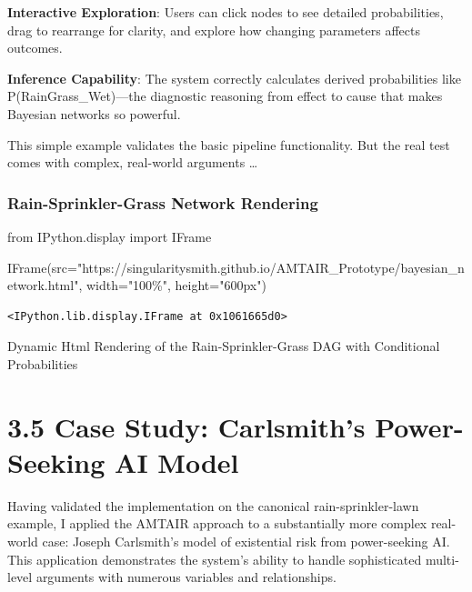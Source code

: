 \documentclass[
  11pt,
  letterpaper,
  openany]{book}
\newenvironment{Shaded}{\begin{snugshade}}{\end{snugshade}}
\newcommand{\ImportTok}[1]{\textcolor[rgb]{0.00,0.46,0.62}{#1}}
\newcommand{\NormalTok}[1]{\textcolor[rgb]{0.00,0.23,0.31}{#1}}
\newcommand{\OperatorTok}[1]{\textcolor[rgb]{0.37,0.37,0.37}{#1}}
\newcommand{\StringTok}[1]{\textcolor[rgb]{0.13,0.47,0.30}{#1}}
\begin{document}
\begin{landscape}
\textbf{Interactive Exploration}: Users can click nodes to see detailed
probabilities, drag to rearrange for clarity, and explore how changing
parameters affects outcomes.

\textbf{Inference Capability}: The system correctly calculates derived
probabilities like P(Rain\textbar Grass\_Wet)---the diagnostic reasoning
from effect to cause that makes Bayesian networks so powerful.

This simple example validates the basic pipeline functionality. But the
real test comes with complex, real-world arguments \ldots{}

\subsubsection{Rain-Sprinkler-Grass Network
Rendering}\label{rain-sprinkler-grass-network-rendering-1}

\begin{Shaded}
\begin{Highlighting}[]
\ImportTok{from}\NormalTok{ IPython.display }\ImportTok{import}\NormalTok{ IFrame}

\NormalTok{IFrame(src}\OperatorTok{=}\StringTok{"https://singularitysmith.github.io/AMTAIR\_Prototype/bayesian\_network.html"}\NormalTok{, width}\OperatorTok{=}\StringTok{"100\%"}\NormalTok{, height}\OperatorTok{=}\StringTok{"600px"}\NormalTok{)}
\end{Highlighting}
\end{Shaded}

\label{rain_sprinkler_grass_example_network_rendering2}
\begin{verbatim}
<IPython.lib.display.IFrame at 0x1061665d0>
\end{verbatim}

Dynamic Html Rendering of the Rain-Sprinkler-Grass DAG with Conditional
Probabilities

\end{landscape}

\section{3.5 Case Study: Carlsmith's Power-Seeking AI
Model}\label{sec-case-carlsmith}

Having validated the implementation on the canonical rain-sprinkler-lawn
example, I applied the AMTAIR approach to a substantially more complex
real-world case: Joseph Carlsmith's model of existential risk from
power-seeking AI. This application demonstrates the system's ability to
handle sophisticated multi-level arguments with numerous variables and
relationships.
\end{document}
